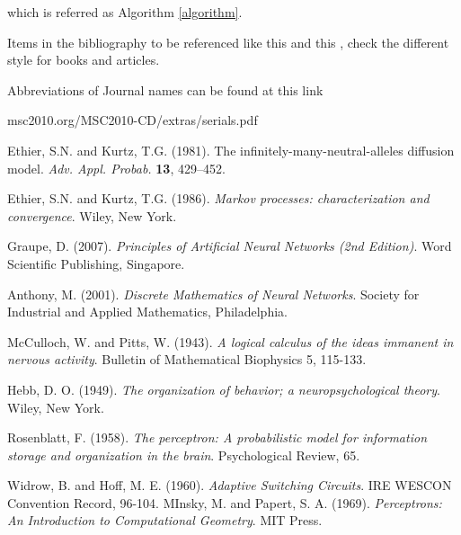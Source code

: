 \documentclass[%
    corpo=11pt,
    twoside,
    stile=classica,
    oldstyle,
    autoretitolo,
    tipotesi=magistrale,
    greek,
    evenboxes,
    english
]{toptesi}
\begin{document}
which is referred as Algorithm \ref{algorithm}. 







\newpage
Items in the bibliography to be referenced like this \cite{EK86} and this \cite{EK81}, check the different style for books and articles. 

Abbreviations of Journal names can be found at this link

msc2010.org/MSC2010-CD/extras/serials.pdf




\begin{thebibliography}{99}

  {\sc Ethier, S.N.} and {\sc Kurtz, T.G.} (1981). The infinitely-many-neutral-alleles diffusion model. {\em Adv. Appl. Probab.} {\bf 13}, 429--452.

  {\sc Ethier, S.N.} and {\sc Kurtz, T.G.} (1986). \emph{Markov processes: characterization and convergence}. Wiley, New York.

 {\sc Graupe, D.} (2007). \textit{Principles of Artificial Neural Networks (2nd Edition)}. Word Scientific Publishing, Singapore.
 
 {\sc Anthony, M. } (2001). \textit{Discrete Mathematics of Neural Networks}. Society for Industrial and Applied Mathematics, Philadelphia.

 {\sc McCulloch, W.} and {\sc Pitts, W}. (1943). \textit{A logical calculus of the ideas immanent in nervous activity}. Bulletin of Mathematical Biophysics 5, 115-133.

 {\sc Hebb, D. O.} (1949). \textit{The organization of behavior; a neuropsychological theory}. Wiley, New York.

 {\sc Rosenblatt, F.} (1958). \textit{The perceptron: A probabilistic model for information storage and organization in the brain}. Psychological Review, 65.

 {\sc Widrow, B.} and {\sc Hoff, M. E.} (1960). \textit{Adaptive Switching Circuits}. IRE WESCON Convention Record, 96-104.
 {\sc MInsky, M.} and {\sc Papert, S. A.} (1969). \textit{Perceptrons: An Introduction to Computational Geometry}. MIT Press.


\end{thebibliography}
\end{document}
